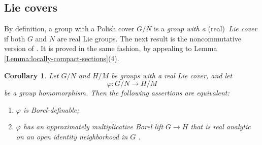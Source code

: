 \documentclass[12pt]{amsart}
\newtheorem{corollary}[theorem]{Corollary}
\theoremstyle{definition}
\begin{document}
\subsection{Lie covers}

By definition, a group with a Polish cover $G/N$ is a \emph{group with a }%
(real)\emph{\ Lie cover} if both $G$ and $N$ are real Lie groups. The next
result is the noncommutative version of \cite[Corollary~6.20]%
{lupini_looking_2024}. It is proved in the same fashion, by appealing to
Lemma \ref{Lemma:locally-compact-sections}(4).

\begin{corollary}
\label{Corollary:Lie} Let $G/N$ and $H/M$ be groups with a real Lie cover,
and let 
\begin{equation*}
\varphi:G/N\longrightarrow H/M
\end{equation*}
be a group homomorphism. Then the following assertions are equivalent:

\begin{enumerate}
\item $\varphi$ is Borel-definable;

\item $\varphi $ has an approximately multiplicative Borel lift $%
G\rightarrow H$ that is real analytic on an open identity neighborhood in $G$%
.
\end{enumerate}
\end{corollary}



\end{document}
